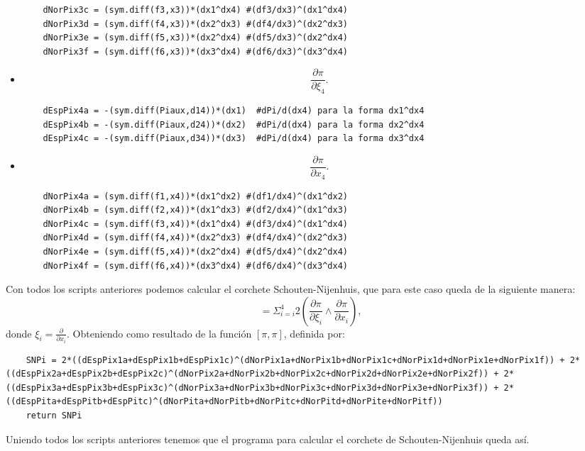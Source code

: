 \documentclass[a4paper,10pt]{book}
\begin{document}
\begin{itemize}
\begin{lstlisting}
    dNorPix3c = (sym.diff(f3,x3))*(dx1^dx4) #(df3/dx3)^(dx1^dx4)
    dNorPix3d = (sym.diff(f4,x3))*(dx2^dx3) #(df4/dx3)^(dx2^dx3)
    dNorPix3e = (sym.diff(f5,x3))*(dx2^dx4) #(df5/dx3)^(dx2^dx4)
    dNorPix3f = (sym.diff(f6,x3))*(dx3^dx4) #(df6/dx3)^(dx3^dx4)
\end{lstlisting}
\item $$\frac{\partial \pi}{\partial \xi_{4}}.$$
\lstset{stepnumber=0}
\begin{lstlisting}
    dEspPix4a = -(sym.diff(Piaux,d14))*(dx1)  #dPi/d(dx4) para la forma dx1^dx4
    dEspPix4b = -(sym.diff(Piaux,d24))*(dx2)  #dPi/d(dx4) para la forma dx2^dx4
    dEspPix4c = -(sym.diff(Piaux,d34))*(dx3)  #dPi/d(dx4) para la forma dx3^dx4
\end{lstlisting}
\item $$\frac{\partial \pi}{\partial x_{4}}.$$
\lstset{stepnumber=0}
\begin{lstlisting}
    dNorPix4a = (sym.diff(f1,x4))*(dx1^dx2) #(df1/dx4)^(dx1^dx2)
    dNorPix4b = (sym.diff(f2,x4))*(dx1^dx3) #(df2/dx4)^(dx1^dx3)
    dNorPix4c = (sym.diff(f3,x4))*(dx1^dx4) #(df3/dx4)^(dx1^dx4)
    dNorPix4d = (sym.diff(f4,x4))*(dx2^dx3) #(df4/dx4)^(dx2^dx3)
    dNorPix4e = (sym.diff(f5,x4))*(dx2^dx4) #(df5/dx4)^(dx2^dx4)
    dNorPix4f = (sym.diff(f6,x4))*(dx3^dx4) #(df6/dx4)^(dx3^dx4)
\end{lstlisting}
\end{itemize}
Con todos los scripts anteriores podemos calcular el corchete Schouten-Nijenhuis, que para este caso queda de la siguiente manera:
\begin{equation*}
[\pi,\pi]  =  \Sigma_{i=i}^{4}2\left( \frac{\partial \pi}{\partial \xi_{i}}\wedge\frac{\partial \pi}{\partial x_{i}} \right), 
\end{equation*} 
donde $\xi_{i}=\frac{\partial }{\partial x_{i}}$. Obteniendo como resultado de la funci\'on $[\pi,\pi]$, definida por: 
\lstset{stepnumber=0}
\begin{lstlisting}
    SNPi = 2*((dEspPix1a+dEspPix1b+dEspPix1c)^(dNorPix1a+dNorPix1b+dNorPix1c+dNorPix1d+dNorPix1e+dNorPix1f)) + 2*((dEspPix2a+dEspPix2b+dEspPix2c)^(dNorPix2a+dNorPix2b+dNorPix2c+dNorPix2d+dNorPix2e+dNorPix2f)) + 2*((dEspPix3a+dEspPix3b+dEspPix3c)^(dNorPix3a+dNorPix3b+dNorPix3c+dNorPix3d+dNorPix3e+dNorPix3f)) + 2*((dEspPita+dEspPitb+dEspPitc)^(dNorPita+dNorPitb+dNorPitc+dNorPitd+dNorPite+dNorPitf))
    return SNPi    
\end{lstlisting}
Uniendo todos los scripts anteriores tenemos que el programa para calcular el corchete de Schouten-Nijenhuis queda as\'i.
\end{document}
